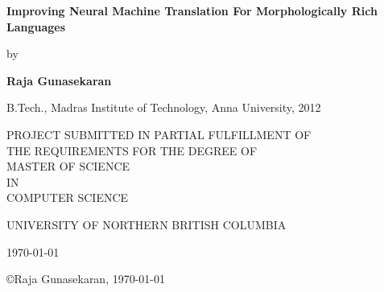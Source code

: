 \thispagestyle{empty}
\topmargin 0in

\vspace*{.3cm}
\begin{center}
\begin{large} 
\textbf{Improving Neural Machine Translation For Morphologically Rich Languages}
\end{large}

\vspace*{.6cm}

by

\vspace*{.6cm}

\textbf{Raja Gunasekaran}

B.Tech., Madras Institute of Technology, Anna University, 2012\\


\vspace*{4cm}

PROJECT SUBMITTED IN PARTIAL FULFILLMENT OF\\
THE REQUIREMENTS FOR THE DEGREE OF\\
MASTER OF SCIENCE\\
IN\\
COMPUTER SCIENCE\\
 
\vspace*{4.5cm}

UNIVERSITY OF NORTHERN BRITISH COLUMBIA\\
   
\vspace*{.002cm}
   
\mydate
\today

\vspace*{.25cm}

\copyright  Raja Gunasekaran, \myyear
\today
\end{center}


